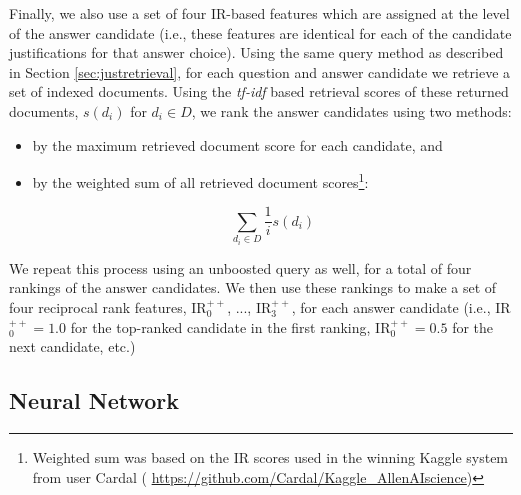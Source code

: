 {} 
Finally, we also use a set of four IR-based features which are assigned at the level of the answer candidate (i.e., these features are identical for each of the candidate justifications for that answer choice).   
Using the same query method as described in Section \ref{sec:justretrieval}, for each question and answer candidate we retrieve a set of indexed documents.
Using the \emph{tf-idf} based retrieval scores of these returned documents, 
$s(d_i)$ for $d_i \in D$, we rank the answer candidates using two methods: 
\begin{itemize}
\item by the maximum retrieved document score for each candidate, and  
\item by the weighted sum of all retrieved document scores\footnote{Weighted sum was based on the IR scores used in the winning Kaggle system from user Cardal (\scriptsize{ \url{https://github.com/Cardal/Kaggle_AllenAIscience}})}:
\begin{footnotesize}
\vspace{-5mm}
\begin{equation}
\sum_{d_i \in D} \dfrac{1}{i} s(d_i) 
\end{equation}
\vspace{-7mm}
\end{footnotesize} 
\end{itemize}
We repeat this process using an unboosted query as well, for a total of four rankings of the answer candidates.  
We then use these rankings to make a set of four reciprocal rank features,  IR$^{++}_0$, ..., IR$^{++}_3$, for each answer candidate (i.e., IR$^{++}_0 = 1.0$ for the top-ranked candidate in the first ranking,  IR$^{++}_0 = 0.5$ for the next candidate, etc.)
  


\subsection{Neural Network}
\label{sec:nn_model}


